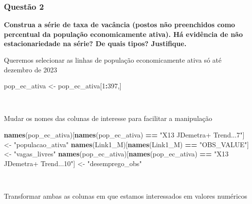 \documentclass[
]{article}
\newenvironment{Shaded}{\begin{snugshade}}{\end{snugshade}}
\newcommand{\DecValTok}[1]{\textcolor[rgb]{0.00,0.00,0.81}{#1}}
\newcommand{\FunctionTok}[1]{\textcolor[rgb]{0.13,0.29,0.53}{\textbf{#1}}}
\newcommand{\NormalTok}[1]{#1}
\newcommand{\OtherTok}[1]{\textcolor[rgb]{0.56,0.35,0.01}{#1}}
\newcommand{\SpecialCharTok}[1]{\textcolor[rgb]{0.81,0.36,0.00}{\textbf{#1}}}
\newcommand{\StringTok}[1]{\textcolor[rgb]{0.31,0.60,0.02}{#1}}
\begin{document}
\subsubsection{Questão 2}\label{questuxe3o-2}

\textbf{Construa a série de taxa de vacância (postos não preenchidos
como percentual da população economicamente ativa). Há evidência de não
estacionariedade na série? De quais tipos? Justifique.}

Queremos selecionar as linhas de população economicamente ativa só até
dezembro de 2023

\begin{Shaded}
\begin{Highlighting}[]
\NormalTok{pop\_ec\_ativa }\OtherTok{\textless{}{-}}\NormalTok{ pop\_ec\_ativa[}\DecValTok{1}\SpecialCharTok{:}\DecValTok{397}\NormalTok{,]}
\end{Highlighting}
\end{Shaded}

~

Mudar os nomes das colunas de interesse para facilitar a manipulação

\begin{Shaded}
\begin{Highlighting}[]
\FunctionTok{names}\NormalTok{(pop\_ec\_ativa)[}\FunctionTok{names}\NormalTok{(pop\_ec\_ativa) }\SpecialCharTok{==} \StringTok{"X13 JDemetra+  Trend...7"}\NormalTok{] }\OtherTok{\textless{}{-}} \StringTok{"populacao\_ativa"}
\FunctionTok{names}\NormalTok{(Link1\_M)[}\FunctionTok{names}\NormalTok{(Link1\_M) }\SpecialCharTok{==} \StringTok{"OBS\_VALUE"}\NormalTok{] }\OtherTok{\textless{}{-}} \StringTok{"vagas\_livres"}
\FunctionTok{names}\NormalTok{(pop\_ec\_ativa)[}\FunctionTok{names}\NormalTok{(pop\_ec\_ativa) }\SpecialCharTok{==} \StringTok{"X13 JDemetra+  Trend...10"}\NormalTok{] }\OtherTok{\textless{}{-}} \StringTok{"desemprego\_obs"}
\end{Highlighting}
\end{Shaded}

~

Transformar ambas as colunas em que estamos interessados em valores
numéricos

\begin{Shaded}
\end{Shaded}
\end{document}
